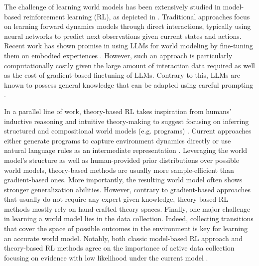 \documentclass{article}
\begin{document}
The challenge of learning world models has been extensively studied in model-based reinforcement learning (RL), as depicted in \citet{moerland_model-based_2022}. Traditional approaches focus on learning forward dynamics models through direct interactions, typically using neural networks to predict next observations given current states and actions. Recent work has shown promise in using LLMs for world modeling by fine-tuning them on embodied experiences \citep{xiang_language_2023}. However, such an approach is particularly computationally costly given the large amount of interaction data required as well as the cost of gradient-based finetuning of LLMs. Contrary to this, LLMs are known to possess general knowledge that can be adapted using careful prompting \citep{zhang_language-guided_2024}. 

In a parallel line of work, theory-based RL takes inspiration from humans' inductive reasoning and intuitive theory-making to suggest focusing on inferring structured and compositional world models (e.g. programs) \citep{tsividis_human-level_2021}. Current approaches either generate programs to capture environment dynamics directly \citep{tsividis_human-level_2021, tang_worldcoder_2024, li_automated_2024} or use natural language rules as an intermediate representation \citep{piriyakulkij_doing_2024, wang_hypothesis_2023}. Leveraging the world model's structure as well as human-provided prior distributions over possible world models, theory-based methods are usually more sample-efficient than gradient-based ones. More importantly, the resulting world model often shows stronger generalization abilities. However, contrary to gradient-based approaches that usually do not require any expert-given knowledge, theory-based RL methods mostly rely on hand-crafted theory spaces. Finally, one major challenge in learning a world model lies in the data collection. Indeed, collecting transitions that cover the space of possible outcomes in the environment is key for learning an accurate world model. Notably, both classic model-based RL approach and theory-based RL methods agree on the importance of active data collection focusing on evidence with low likelihood under the current model \citep{schmidhuber_curious_1991, pathak_curiosity-driven_2017, burda_exploration_2018, piriyakulkij_doing_2024}.
\end{document}
